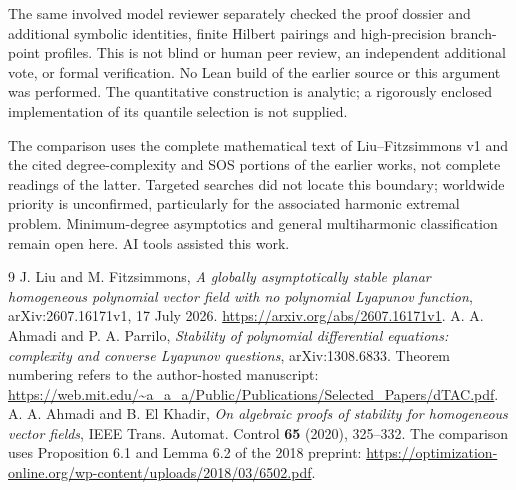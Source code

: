 \documentclass[11pt]{article}
\theoremstyle{remark}\newtheorem{remark}[theorem]{Remark}
\begin{document}
The same involved model reviewer separately checked the proof
dossier and additional symbolic identities, finite Hilbert
pairings and high-precision branch-point profiles.
This is not blind or human peer review, an independent additional
vote, or formal verification. No Lean build of the earlier
source or this argument was performed.
The quantitative construction is analytic; a rigorously enclosed
implementation of its quantile selection is not supplied.

The comparison uses the complete mathematical text of
Liu--Fitzsimmons v1 and the cited degree-complexity and SOS portions
of the earlier works, not complete readings of the latter.
Targeted searches did not locate this boundary; worldwide priority
is unconfirmed, particularly for the associated harmonic extremal
problem. Minimum-degree asymptotics and general multiharmonic
classification remain open here. AI tools assisted this work.

\small
\begin{thebibliography}{9}
J. Liu and M. Fitzsimmons,
\emph{A globally asymptotically stable planar homogeneous polynomial
vector field with no polynomial Lyapunov function},
arXiv:2607.16171v1, 17 July 2026.
\url{https://arxiv.org/abs/2607.16171v1}.
A. A. Ahmadi and P. A. Parrilo,
\emph{Stability of polynomial differential equations:
complexity and converse Lyapunov questions}, arXiv:1308.6833.
Theorem numbering refers to the author-hosted manuscript:
\url{https://web.mit.edu/~a_a_a/Public/Publications/Selected_Papers/dTAC.pdf}.
A. A. Ahmadi and B. El Khadir,
\emph{On algebraic proofs of stability for homogeneous vector fields},
IEEE Trans. Automat. Control \textbf{65} (2020), 325--332.
The comparison uses Proposition 6.1 and Lemma 6.2 of the 2018 preprint:
\url{https://optimization-online.org/wp-content/uploads/2018/03/6502.pdf}.
\end{thebibliography}
\end{document}
